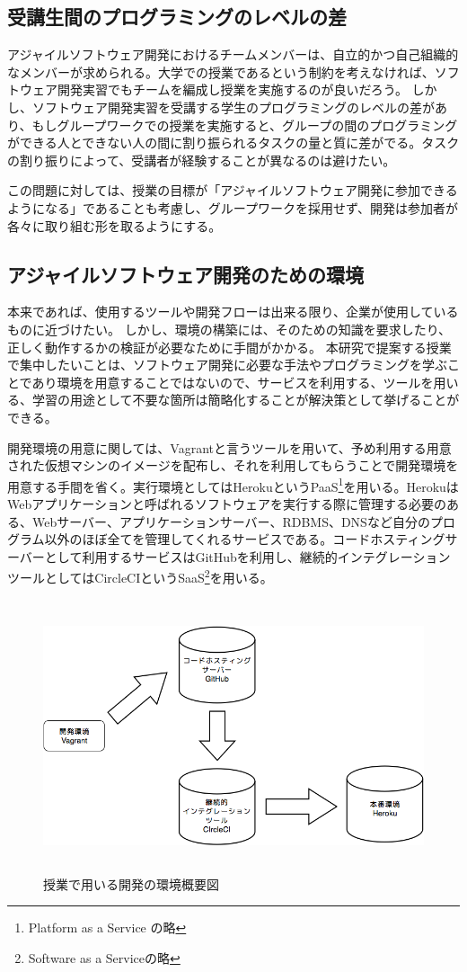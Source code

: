 \subsection{受講生間のプログラミングのレベルの差}

アジャイルソフトウェア開発におけるチームメンバーは、自立的かつ自己組織的なメンバーが求められる。大学での授業であるという制約を考えなければ、ソフトウェア開発実習でもチームを編成し授業を実施するのが良いだろう。
しかし、ソフトウェア開発実習を受講する学生のプログラミングのレベルの差があり、もしグループワークでの授業を実施すると、グループの間のプログラミングができる人とできない人の間に割り振られるタスクの量と質に差がでる。タスクの割り振りによって、受講者が経験することが異なるのは避けたい。

この問題に対しては、授業の目標が「アジャイルソフトウェア開発に参加できるようになる」であることも考慮し、グループワークを採用せず、開発は参加者が各々に取り組む形を取るようにする。

\subsection{アジャイルソフトウェア開発のための環境}

本来であれば、使用するツールや開発フローは出来る限り、企業が使用しているものに近づけたい。
しかし、環境の構築には、そのための知識を要求したり、正しく動作するかの検証が必要なために手間がかかる。
本研究で提案する授業で集中したいことは、ソフトウェア開発に必要な手法やプログラミングを学ぶことであり環境を用意することではないので、サービスを利用する、ツールを用いる、学習の用途として不要な箇所は簡略化することが解決策として挙げることができる。

開発環境の用意に関しては、Vagrantと言うツールを用いて、予め利用する用意された仮想マシンのイメージを配布し、それを利用してもらうことで開発環境を用意する手間を省く。実行環境としてはHerokuというPaaS\footnote{Platform as a Service の略}を用いる。HerokuはWebアプリケーションと呼ばれるソフトウェアを実行する際に管理する必要のある、Webサーバー、アプリケーションサーバー、RDBMS、DNSなど自分のプログラム以外のほぼ全てを管理してくれるサービスである。コードホスティングサーバーとして利用するサービスはGitHubを利用し、継続的インテグレーションツールとしてはCircleCIというSaaS\footnote{Software as a Serviceの略}を用いる。

\begin{figure}[H]
\centering
\includegraphics[height=8cm]{./assets/images/class_dev_env.png}
\caption{授業で用いる開発の環境概要図}
\label{fig:class_dev_env}
\end{figure}
